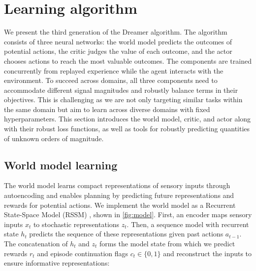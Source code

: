 

\section*{Learning algorithm}
\label{sec:algorithm}

We present the third generation of the Dreamer algorithm\citep{hafner2019dreamer,hafner2020dreamerv2}.
The algorithm consists of three neural networks: the world model predicts the outcomes of potential actions, the critic judges the value of each outcome, and the actor chooses actions to reach the most valuable outcomes.
The components are trained concurrently from replayed experience while the agent interacts with the environment.
To succeed across domains, all three components need to accommodate different signal magnitudes and robustly balance terms in their objectives.
This is challenging as we are not only targeting similar tasks within the same domain but aim to learn across diverse domains with fixed hyperparameters.
This section introduces the world model, critic, and actor along with their robust loss functions, as well as tools for robustly predicting quantities of unknown orders of magnitude.

\subsection*{World model learning}

The world model learns compact representations of sensory inputs through autoencoding \citep{kingma2013vae} and enables planning by predicting future representations and rewards for potential actions.
We implement the world model as a Recurrent State-Space Model (RSSM) \citep{hafner2018planet}, shown in \cref{fig:model}.
First, an encoder maps sensory inputs $x_t$ to stochastic representations $z_t$.
Then, a sequence model with recurrent state $h_t$ predicts the sequence of these representations given past actions $a_{t-1}$.
The concatenation of $h_t$ and $z_t$ forms the model state from which we predict rewards $r_t$ and episode continuation flags $c_t\in\{0,1\}$ and reconstruct the inputs to ensure informative representations:

